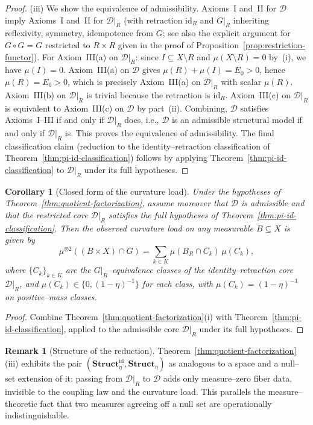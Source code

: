 \documentclass[11pt]{article}
\numberwithin{equation}{section}
\newtheorem{corollary}[theorem]{Corollary}
\theoremstyle{definition}
\newtheorem{remark}[theorem]{Remark}
\begin{document}
\begin{proof}
(iii) We show the equivalence of admissibility. Axioms~I and~II for $\mathcal D$ imply Axioms~I and~II for $\mathcal D|_R$ (with retraction $\mathrm{id}_R$ and $G|_R$ inheriting reflexivity, symmetry, idempotence from $G$; see also the explicit argument for $G\circ G=G$ restricted to $R\times R$ given in the proof of Proposition~\ref{prop:restriction-functor}). For Axiom~III(a) on $\mathcal D|_R$: since $I\subseteq X\setminus R$ and $\mu(X\setminus R)=0$ by~(i), we have $\mu(I)=0$. Axiom~III(a) on $\mathcal D$ gives $\mu(R)+\mu(I)=E_0>0$, hence $\mu(R)=E_0>0$, which is precisely Axiom~III(a) on $\mathcal D|_R$ with scalar $\mu(R)$. Axiom~III(b) on $\mathcal D|_R$ is trivial because the retraction is $\mathrm{id}_R$. Axiom~III(c) on $\mathcal D|_R$ is equivalent to Axiom~III(c) on $\mathcal D$ by part~(ii). Combining, $\mathcal D$ satisfies Axioms~I--III if and only if $\mathcal D|_R$ does, i.e., $\mathcal D$ is an admissible structural model if and only if $\mathcal D|_R$ is. This proves the equivalence of admissibility. The final classification claim (reduction to the identity--retraction classification of Theorem~\ref{thm:pi-id-classification}) follows by applying Theorem~\ref{thm:pi-id-classification} to $\mathcal D|_R$ under its full hypotheses.
\end{proof}

\begin{corollary}[Closed form of the curvature load]\label{cor:curvature-load-closed-form}
Under the hypotheses of Theorem~\ref{thm:quotient-factorization}, assume moreover that $\mathcal D$ is admissible and that the restricted core $\mathcal D|_R$ satisfies the full hypotheses of Theorem~\ref{thm:pi-id-classification}. Then the observed curvature load on any measurable $B\subseteq X$ is given by
\[
\mu^{\otimes2}((B\times X)\cap G)=\sum_{k\in K}\mu(B_R\cap C_k)\,\mu(C_k),
\]
where $\{C_k\}_{k\in K}$ are the $G|_R$--equivalence classes of the identity--retraction core $\mathcal D|_R$, and $\mu(C_k)\in\{0,(1-\eta)^{-1}\}$ for each class, with $\mu(C_k)=(1-\eta)^{-1}$ on positive--mass classes.
\end{corollary}

\begin{proof}
Combine Theorem~\ref{thm:quotient-factorization}(i) with Theorem~\ref{thm:pi-id-classification}, applied to the admissible core $\mathcal D|_R$ under its full hypotheses.
\end{proof}

\begin{remark}[Structure of the reduction]\label{rem:reduction-structure}
\sloppy
Theorem~\ref{thm:quotient-factorization}(iii) exhibits the pair $(\mathbf{Struct}^{\mathrm{id}}_{\eta},\allowbreak\mathbf{Struct}_{\eta})$ as analogous to a space and a null--set extension of it: passing from $\mathcal D|_R$ to $\mathcal D$ adds only measure--zero fiber data, invisible to the coupling law and the curvature load. This parallels the measure--theoretic fact that two measures agreeing off a null set are operationally indistinguishable.
\end{remark}
\end{document}
